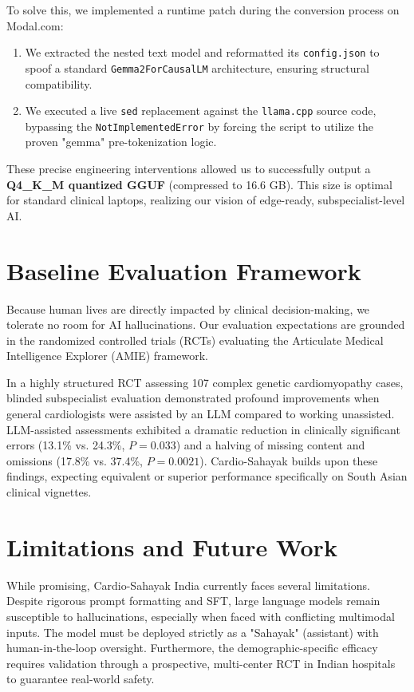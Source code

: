 \documentclass[11pt,a4paper]{article}
\begin{document}
To solve this, we implemented a runtime patch during the conversion process on Modal.com:
\begin{enumerate}
    \item We extracted the nested text model and reformatted its \texttt{config.json} to spoof a standard \texttt{Gemma2ForCausalLM} architecture, ensuring structural compatibility.
    \item We executed a live \texttt{sed} replacement against the \texttt{llama.cpp} source code, bypassing the \texttt{NotImplementedError} by forcing the script to utilize the proven "gemma" pre-tokenization logic.
\end{enumerate}

These precise engineering interventions allowed us to successfully output a \textbf{Q4\_K\_M quantized GGUF} (compressed to 16.6 GB). This size is optimal for standard clinical laptops, realizing our vision of edge-ready, subspecialist-level AI.

\section{Baseline Evaluation Framework}

Because human lives are directly impacted by clinical decision-making, we tolerate no room for AI hallucinations. Our evaluation expectations are grounded in the randomized controlled trials (RCTs) evaluating the Articulate Medical Intelligence Explorer (AMIE) framework. 

In a highly structured RCT assessing 107 complex genetic cardiomyopathy cases, blinded subspecialist evaluation demonstrated profound improvements when general cardiologists were assisted by an LLM compared to working unassisted. LLM-assisted assessments exhibited a dramatic reduction in clinically significant errors (13.1\% vs. 24.3\%, $P=0.033$) and a halving of missing content and omissions (17.8\% vs. 37.4\%, $P=0.0021$). Cardio-Sahayak builds upon these findings, expecting equivalent or superior performance specifically on South Asian clinical vignettes.

\section{Limitations and Future Work}
While promising, Cardio-Sahayak India currently faces several limitations. Despite rigorous prompt formatting and SFT, large language models remain susceptible to hallucinations, especially when faced with conflicting multimodal inputs. The model must be deployed strictly as a "Sahayak" (assistant) with human-in-the-loop oversight. Furthermore, the demographic-specific efficacy requires validation through a prospective, multi-center RCT in Indian hospitals to guarantee real-world safety.
\end{document}
